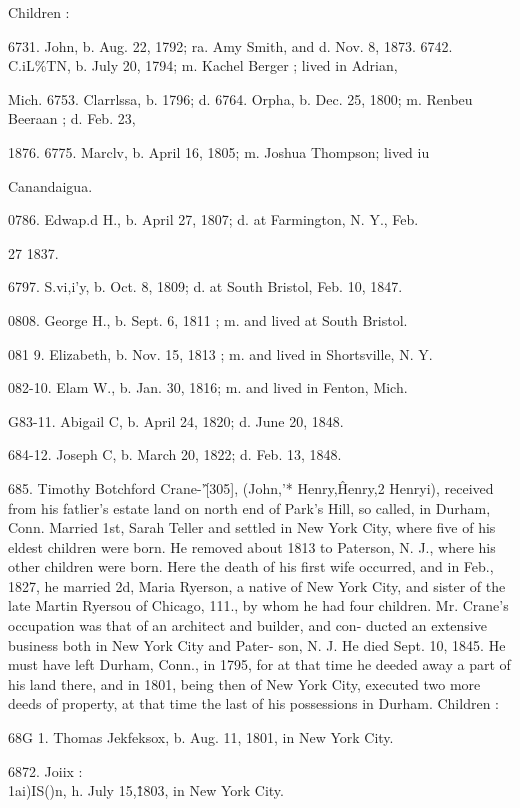 Children : 

6731. John, b. Aug. 22, 1792; ra. Amy Smith, and d. Nov. 8, 1873. 
6742. C.iL\%TN, b. July 20, 1794; m. Kachel Berger ; lived in Adrian, 

Mich. 
6753. Clarrlssa, b. 1796; d. 
6764. Orpha, b. Dec. 25, 1800; m. Renbeu Beeraan ; d. Feb. 23, 

1876. 
6775. Marclv, b. April 16, 1805; m. Joshua Thompson; lived iu 

Canandaigua. 




0786. Edwap.d H., b. April 27, 1807; d. at Farmington, N. Y., Feb. 

27 1837. 

6797. S.vi,i'y, b. Oct. 8, 1809; d. at South Bristol, Feb. 10, 1847. 

0808. George H., b. Sept. 6, 1811 ; m. and lived at South Bristol. 

081  9. Elizabeth, b. Nov. 15, 1813 ; m. and lived in Shortsville, N. Y. 

082-10. Elam W., b. Jan. 30, 1816; m. and lived in Fenton, Mich. 

G83-11. Abigail C, b. April 24, 1820; d. June 20, 1848. 

684-12. Joseph C, b. March 20, 1822; d. Feb. 13, 1848. 

685. Timothy Botchford Crane-'\^ [305], (John,'* Henry,\^ 
Henry,2 Henryi), received from his fatlier's estate land on north 
end of Park's Hill, so called, in Durham, Conn. Married 1st, 
Sarah Teller and settled in New York City, where five of his 
eldest children were born. He removed about 1813 to Paterson, 
N. J., where his other children were born. Here the death of 
his first wife occurred, and in Feb., 1827, he married 2d, Maria 
Ryerson, a native of New York City, and sister of the late Martin 
Ryersou of Chicago, 111., by whom he had four children. Mr. 
Crane's occupation was that of an architect and builder, and con- 
ducted an extensive business both in New York City and Pater- 
son, N. J. He died Sept. 10, 1845. He must have left Durham, 
Conn., in 1795, for at that time he deeded away a part of his land 
there, and in 1801, being then of New York City, executed two 
more deeds of property, at that time the last of his possessions in 
Durham. Children : 

68G 1. Thomas Jekfeksox, b. Aug. 11, 1801, in New York City. 

6872. Joiix :\\1ai)IS()n, h. July 15,\^1803, in New York City. 

